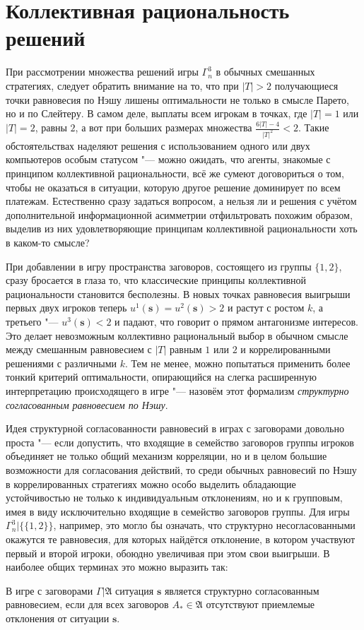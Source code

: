 \section{Коллективная рациональность решений}\label{sec:ch2/sec5}

При рассмотрении множества решений игры $\Gamma^3_n$ в обычных смешанных стратегиях, следует обратить внимание на то, что при $\left| T \right| > 2$ получающиеся точки равновесия по Нэшу лишены оптимальности не только в смысле Парето, но и по Слейтеру. В самом деле, выплаты всем игрокам в точках, где $\left| T \right| = 1$ или $\left| T \right| = 2$, равны $2$, а вот при больших размерах множества $\frac{6 \left| T \right| - 4}{\left| T \right|^2} < 2$. Такие обстоятельствах наделяют решения с использованием одного или двух компьютеров особым статусом "--- можно ожидать, что агенты, знакомые с принципом коллективной рациональности, всё же сумеют договориться о том, чтобы не оказаться в ситуации, которую другое решение доминирует по всем платежам. Естественно сразу задаться вопросом, а нельзя ли и решения с учётом дополнительной информационной асимметрии отфильтровать похожим образом, выделив из них удовлетворяющие принципам коллективной рациональности хоть в каком-то смысле?

При добавлении в игру пространства заговоров, состоящего из группы $\{1, 2\}$, сразу бросается в глаза то, что классические принципы коллективной рациональности становится бесполезны. В новых точках равновесия выигрыши первых двух игроков теперь $u^1(\mathbf{s}) = u^2(\mathbf{s}) > 2$ и растут с ростом $k$, а третьего "--- $u^3(\mathbf{s}) < 2$ и падают, что говорит о прямом антагонизме интересов. Это делает невозможным коллективно рациональный выбор в обычном смысле между смешанным равновесием с $\left| T \right|$ равным $1$ или $2$ и коррелированными решениями с различными $k$. Тем не менее, можно попытаться применить более тонкий критерий оптимальности, опирающийся на слегка расширенную интерпретацию происходящего в игре "--- назовём этот формализм \emph{структурно согласованным равновесием по Нэшу}.

Идея структурной согласованности равновесий в играх с заговорами довольно проста "--- если допустить, что входящие в семейство заговоров группы игроков объединяет не только общий механизм корреляции, но и в целом большие возможности для согласования действий, то среди обычных равновесий по Нэшу в коррелированных стратегиях можно особо выделить обладающие устойчивостью не только к индивидуальным отклонениям, но и к групповым, имея в виду исключительно входящие в семейство заговоров группы. Для игры $\Gamma^3_n | \{\{1,2\}\}$, например, это могло бы означать, что структурно несогласованными окажутся те равновесия, для которых найдётся отклонение, в котором участвуют первый и второй игроки, обоюдно увеличивая при этом свои выигрыши. В наиболее общих терминах это можно выразить так:
\begin{definition}
	В игре с заговорами $\Gamma | \mathfrak{A}$ ситуация $\mathbf{s}$ является структурно согласованным равновесием, если для всех заговоров $A_* \in \mathfrak{A}$ отсутствуют приемлемые отклонения от ситуации $\mathbf{s}$.
\end{definition}

